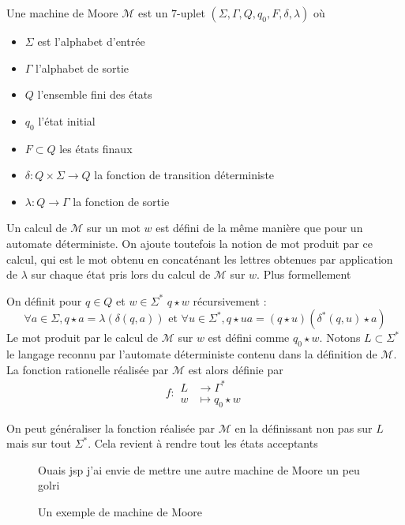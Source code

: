 \documentclass{scrartcl}
\begin{document}
\begin{flushleft}
\begin{define}
    Une machine de Moore $\mathcal{M}$ est un $7$-uplet $(\Sigma, \Gamma, Q, q_0, F, \delta, \lambda)$ où
    \begin{itemize}
        \item $\Sigma$ est l'alphabet d'entrée
        \item $\Gamma$ l'alphabet de sortie
        \item $Q$ l'ensemble fini des états
        \item $q_0$ l'état initial
        \item $F \subset Q$ les états finaux
        \item $\delta : Q \times \Sigma \rightarrow Q$ la fonction de transition déterministe
        \item $\lambda : Q \rightarrow \Gamma$ la fonction de sortie
    \end{itemize}
\end{define}

Un calcul de $\mathcal{M}$ sur un mot $w$ est défini de la même manière que pour un automate déterministe. On ajoute
toutefois la notion de mot produit par ce calcul, qui est le mot obtenu en concaténant les lettres obtenues
par application de $\lambda$ sur chaque état pris lors du calcul de $\mathcal{M}$ sur $w$. Plus formellement

\begin{define}
    On définit pour $q \in Q$ et $w \in \Sigma^*$ $q \star w$ récursivement :
    \[ \forall a \in \Sigma, q \star a = \lambda(\delta(q, a)) \text{ et } \forall u \in \Sigma^*,
    q \star ua = (q \star u)(\delta^*(q, u) \star a) \]
    Le mot produit par le calcul de $\mathcal{M}$ sur $w$ est défini comme $q_0 \star w$. Notons $L \subset \Sigma^*$
    le langage reconnu par l'automate déterministe contenu dans la définition de $\mathcal{M}$. La fonction rationelle
    réalisée par $\mathcal{M}$ est alors définie par
    \[ f : \begin{array}{cl}
        L &\longrightarrow \Gamma^*\\
        w &\longmapsto q_0 \star w
    \end{array} \]
\end{define}

On peut généraliser la fonction réalisée par $\mathcal{M}$ en la définissant non pas sur $L$ mais sur tout
$\Sigma^*$. Cela revient à rendre tout les états acceptants

\begin{figure}[h]
    \caption{Un exemple de machine de Moore}
    \begin{center}
        Ouais jsp j'ai envie de mettre une autre machine de Moore un peu golri
        \begin{tikzpicture}[auto, node distance = 1.5cm]


\end{tikzpicture}
\end{center}
\end{figure}
\end{flushleft}
\end{document}
